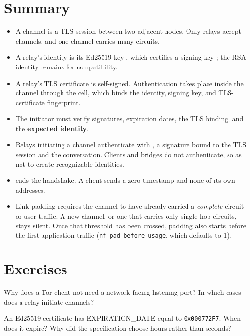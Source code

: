 \section*{Summary}
\begin{itemize}
  \item A channel is a TLS session between two adjacent nodes. Only relays accept channels, and one channel carries many circuits.
  \item A relay's identity is its Ed25519 key , which certifies a signing key ; the RSA identity remains for compatibility.
  \item A relay's TLS certificate is self-signed. Authentication takes place inside the channel through the  cell, which binds the identity, signing key, and TLS-certificate fingerprint.
  \item The initiator must verify signatures, expiration dates, the TLS binding, and the \textbf{expected identity}.
  \item Relays initiating a channel authenticate with , a signature bound to the TLS session and the conversation. Clients and bridges do not authenticate, so as not to create recognizable identities.
  \item {} ends the handshake. A client sends a zero timestamp and none of its own addresses.
  \item Link padding requires the channel to have already carried a \emph{complete} circuit or user traffic. A new channel, or one that carries only single-hop circuits, stays silent. Once that threshold has been crossed, padding also starts before the first application traffic (\texttt{nf\_pad\_before\_usage}, which defaults to 1).
\end{itemize}

\section*{Exercises}

\begin{esercizio}[1]\label{es:07-ruoli}
Why does a Tor client not need a network-facing listening port? In which cases does a relay initiate channels?
\end{esercizio}

\begin{esercizio}[1]\label{es:07-scadenza}
An Ed25519 certificate has EXPIRATION\_DATE equal to \texttt{0x000772F7}. When does it expire? Why did the specification choose hours rather than seconds?
\end{esercizio}

